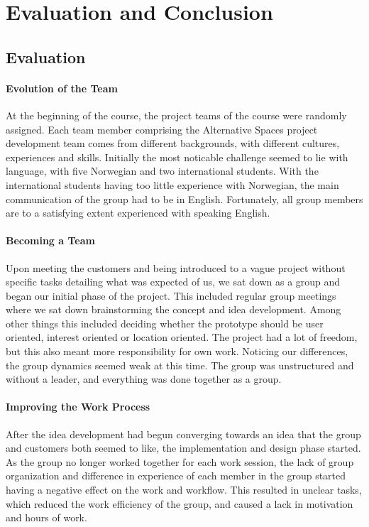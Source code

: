 \chapter{Evaluation and Conclusion}
\label{chap:Eval}

\section{Evaluation} 
\subsubsection{Evolution of the Team} At the beginning of the course, the project teams of the course were randomly assigned. Each team member comprising the Alternative Spaces project development team comes from different backgrounds, with different cultures, experiences and skills. Initially the most noticable challenge seemed to lie with language, with five Norwegian and two international students. With the international students having too little experience with Norwegian, the main communication of the group had to be in English. Fortunately, all group members are to a satisfying extent experienced with speaking English. 
\subsubsection{Becoming a Team} Upon meeting the customers and being introduced to a vague project without specific tasks detailing what was expected of us, we sat down as a group and began our initial phase of the project. This included regular group meetings where we sat down brainstorming the concept and idea development. Among other things this included deciding whether the prototype should be user oriented, interest oriented or location oriented. The project had a lot of freedom, but this also meant more responsibility for own work. Noticing our differences, the group dynamics seemed weak at this time. The group was unstructured and without a leader, and everything was done together as a group. 
\subsubsection{Improving the Work Process} After the idea development had begun converging towards an idea that the group and customers both seemed to like, the implementation and design phase started. As the group no longer worked together for each work session, the lack of group organization and difference in experience of each member in the group started having a negative effect on the work and workflow. This resulted in unclear tasks, which reduced the work efficiency of the group, and caused a lack in motivation and hours of work. 
